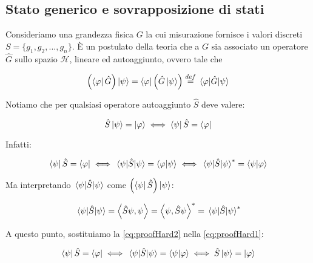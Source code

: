 \subsection{Stato generico e sovrapposizione di stati}

Consideriamo una grandezza fisica $G$ la cui misurazione fornisce i valori discreti $S = \{g_1, g_2, ..., g_n\}$. \`E un postulato della teoria che a $G$ sia associato un operatore $\hat{G}$ sullo spazio $\mathcal{H}$, lineare ed autoaggiunto, ovvero tale che

    \begin{equation}
        \left ( \bra{\varphi} \hat{G} \right ) \ket{\psi} =
        \bra{\varphi} \left ( \hat{G} \ket{\psi} \right ) \overset{def}{=}
        \mel{\varphi}{\hat{G}}{\psi}
    \end{equation}

Notiamo che per qualsiasi operatore autoaggiunto $\hat{S}$ deve valere:
    
    \begin{equation} \label{eq:proofHard0}
        \hat{S} \ket{\psi} = \ket{\varphi} \iff \bra{\psi} \hat{S} = \bra{\varphi}
    \end{equation}
    
Infatti:

    \begin{equation} \label{eq:proofHard1}
        \bra{\psi} \hat{S} = \bra{\varphi} \iff 
        \mel{\psi}{\hat{S}}{\psi} = \braket{\varphi}{\psi} \iff
        \mel{\psi}{\hat{S}}{\psi}^* = \braket{\psi}{\varphi}
    \end{equation}  
    
Ma interpretando $\mel{\psi}{\hat{S}}{\psi}$ come $\left ( \bra{\psi} \hat{S} \right ) \ket{    \psi}$:

    \begin{equation} \label{eq:proofHard2}
        \mel{\psi}{\hat{S}}{\psi} = \left \langle \hat{S} \psi, \psi \right \rangle =
        \left \langle \psi, \hat{S} \psi \right \rangle^* = \mel{\psi}{\hat{S}}{\psi}^*
    \end{equation}
    
A questo punto, sostituiamo la \eqref{eq:proofHard2} nella \eqref{eq:proofHard1}:

    \begin{equation}
        \bra{\psi} \hat{S} = \bra{\varphi} \iff \mel{\psi}{\hat{S}}{\psi} = \braket{\psi}{\varphi} \iff \hat{S} \ket{\psi}  = \ket{\varphi}
    \end{equation}

